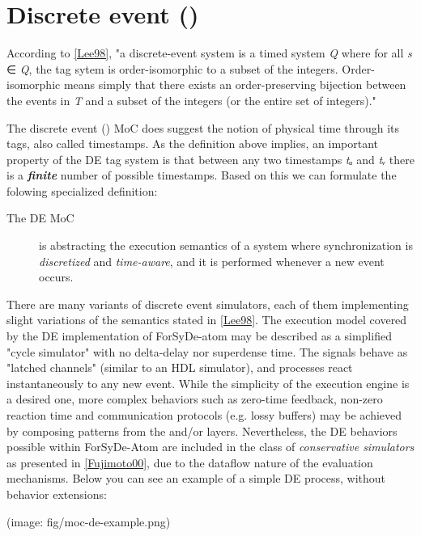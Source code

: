 \section{Discrete event ()}
According to \href{ForSyDe-Atom.html#lee98}{[Lee98]}, "a
 discrete-event system is a timed system \emph{Q} where for all \emph{s}
 ∈ \emph{Q}, the tag sytem is order-isomorphic to a subset of the
 integers. Order-isomorphic means simply that there exists an
 order-preserving bijection between the events in \emph{T} and a subset
 of the integers (or the entire set of integers)."\par
The discrete event () MoC does suggest the notion of physical
 time through its tags, also called timestamps. As the definition
 above implies, an important property of the DE tag system is that
 between any two timestamps \emph{tᵤ} and \emph{tᵥ} there is a
 \textbf{\emph{finite}} number of possible timestamps. Based on this we can
 formulate the folowing specialized definition:\par
\begin{description}
\item[The DE MoC] is abstracting the execution semantics of a system
 where synchronization is \emph{discretized} and \emph{time-aware}, and it
 is performed whenever a new event occurs.
\end{description}There are many variants of discrete event simulators, each of
 them implementing slight variations of the semantics stated in
 \href{ForSyDe-Atom.html#lee98}{[Lee98]}. The execution model covered by
 the DE implementation of ForSyDe-atom may be described as a
 simplified "cycle simulator" with no delta-delay nor superdense
 time. The signals behave as "latched channels" (similar to an HDL
 simulator), and processes react instantaneously to any new
 event. While the simplicity of the execution engine is a desired
 one, more complex behaviors such as zero-time feedback, non-zero
 reaction time and communication protocols (e.g. lossy buffers)
 may be achieved by composing patterns from the 
 and/or  layers. Nevertheless, the DE behaviors
 possible within ForSyDe-Atom are included in the class of
 \emph{conservative simulators} as presented in
 \href{ForSyDe-Atom.html#fuji00}{[Fujimoto00]}, due to the dataflow
 nature of the evaluation mechanisms. Below you can see an example
 of a simple DE process, without behavior extensions:\par
                 (image: fig/moc-de-example.png)\par
